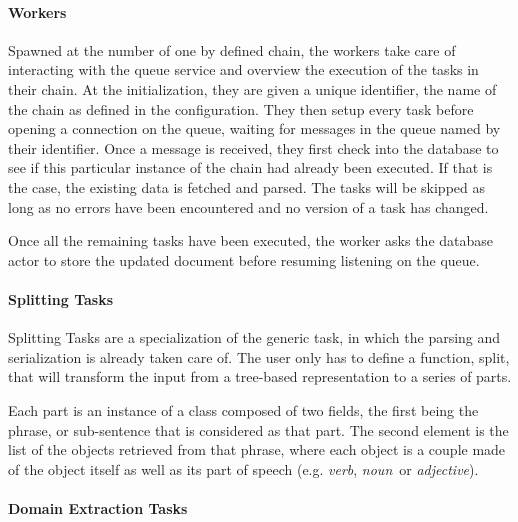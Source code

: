 
\paragraph{Workers} %
\label{par:workers}

Spawned at the number of one by defined chain, the workers take care of interacting with the queue service and overview the execution of the tasks in their chain. At the initialization, they are given a unique identifier, the name of the chain as defined in the configuration. They then setup every task before opening a connection on the queue, waiting for messages in the queue named by their identifier. Once a message is received, they first check into the database to see if this particular instance of the chain had already been executed. If that is the case, the existing data is fetched and parsed. The tasks will be skipped as long as no errors have been encountered and no version of a task has changed.

Once all the remaining tasks have been executed, the worker asks the database actor to store the updated document before resuming listening on the queue.


\paragraph{Splitting Tasks} %
\label{par:splitting_tasks}

Splitting Tasks are a specialization of the generic task, in which the parsing and serialization is already taken care of. The user only has to define a function, split, that will transform the input from a tree-based representation to a series of parts.

Each part is an instance of a class composed of two fields, the first being the phrase, or sub-sentence that is considered as that part. The second element is the list of the objects retrieved from that phrase, where each object is a couple made of the object itself as well as its part of speech (e.g. \emph{verb}, \emph{noun}\ or \emph{adjective}).


\paragraph{Domain Extraction Tasks} %
\label{par:domain_extraction_tasks}

